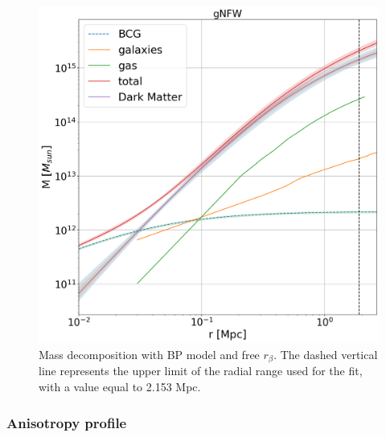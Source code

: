 \begin{figure}[h!]
    \centering
    \includegraphics[width=0.50\linewidth]{Images/Chapter4/BP freebeta=1/mass reconstruction BP freebeta=1.png}
    \caption[Mass decomposition with BP model and free $r_\beta$]{Mass decomposition with BP model and free $r_\beta$. The dashed vertical line represents the upper limit of the radial range used for the fit, with a value equal to 2.153 Mpc.}
    \label{fig:decomposione della massa modello BP e freebeta_1}
\end{figure}


\subsubsection{Anisotropy profile}

